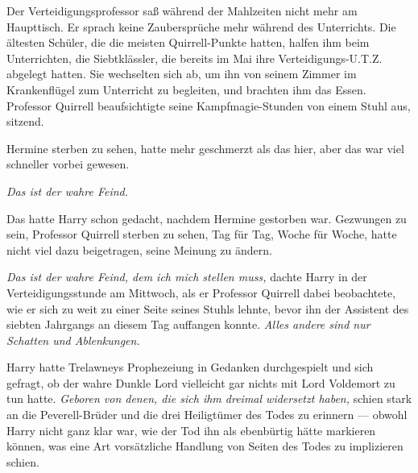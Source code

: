 Der Verteidigungsprofessor saß während der Mahlzeiten nicht mehr am Haupttisch. Er sprach keine Zaubersprüche mehr während des Unterrichts. Die ältesten Schüler, die die meisten Quirrell-Punkte hatten, halfen ihm beim Unterrichten, die Siebtklässler, die bereits im Mai ihre Verteidigungs-U.T.Z. abgelegt hatten. Sie wechselten sich ab, um ihn von seinem Zimmer im Krankenflügel zum Unterricht zu begleiten, und brachten ihm das Essen. Professor Quirrell beaufsichtigte seine Kampfmagie-Stunden von einem Stuhl aus, sitzend.

Hermine sterben zu sehen, hatte mehr geschmerzt als das hier, aber das war viel schneller vorbei gewesen.

\emph{Das ist der wahre Feind.}

Das hatte Harry schon gedacht, nachdem Hermine gestorben war. Gezwungen zu sein, Professor Quirrell sterben zu sehen, Tag für Tag, Woche für Woche, hatte nicht viel dazu beigetragen, seine Meinung zu ändern.

\emph{Das ist der wahre Feind, dem ich mich stellen muss,} dachte Harry in der Verteidigungsstunde am Mittwoch, als er Professor Quirrell dabei beobachtete, wie er sich zu weit zu einer Seite seines Stuhls lehnte, bevor ihn der Assistent des siebten Jahrgangs an diesem Tag auffangen konnte.
\emph{Alles andere sind nur Schatten und Ablenkungen.}

Harry hatte Trelawneys Prophezeiung in Gedanken durchgespielt und sich gefragt, ob der wahre Dunkle Lord vielleicht gar nichts mit Lord Voldemort zu tun hatte.
\emph{Geboren von denen, die sich ihm dreimal widersetzt haben,} schien stark an die Peverell-Brüder und die drei Heiligtümer des Todes zu erinnern — obwohl Harry nicht ganz klar war, wie der Tod ihn als ebenbürtig hätte markieren können, was eine Art vorsätzliche Handlung von Seiten des Todes zu implizieren schien.

